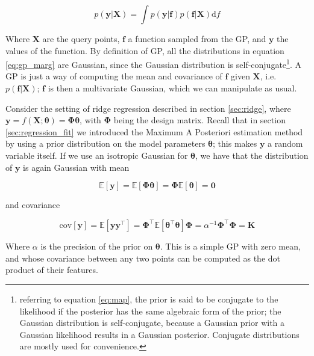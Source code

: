 \documentclass[a4paper]{book}
\begin{document}
\begin{equation}
\label{eq:gp_marg}
p(\bm y\vert\bm X)=\int p(\bm y\vert \bm f)p(\bm f\vert\bm X)\text{d}f
\end{equation}

Where $\bm X$ are the query points, $\bm f$ a function sampled from the GP, and $\bm y$ the values of the function. By definition of GP, all the distributions in equation \ref{eq:gp_marg} are Gaussian, since the Gaussian distribution is self-conjugate\footnote{referring to equation \ref{eq:map}, the prior is said to be conjugate to the likelihood if the posterior has the same algebraic form of the prior; the Gaussian distribution is self-conjugate, because a Gaussian prior with a Gaussian likelihood results in a Gaussian posterior. Conjugate distributions are mostly used for convenience.}. A GP is just a way of computing the mean and covariance of $\bm f$ given $\bm X$, i.e. $p(\bm f\vert\bm X)$; $\bm f$ is then a multivariate Gaussian, which we can manipulate as usual.

Consider the setting of ridge regression described in section \ref{sec:ridge}, where $\bm y=f(\bm X;\bm\theta)=\bm\Phi\bm\theta$, with $\bm\Phi$ being the design matrix. Recall that in section \ref{sec:regression_fit} we introduced the Maximum A Posteriori estimation method by using a prior distribution on the model parameters $\bm\theta$; this makes $\bm y$ a random variable itself. If we use an isotropic Gaussian for $\bm\theta$, we have that the distribution of $\bm y$ is again Gaussian with mean

\begin{equation}
\mathbb{E}[\bm y]=\mathbb{E}[\bm\Phi\bm\theta]=\bm\Phi\mathbb{E}[\bm\theta]=\bm 0
\end{equation}

and covariance

\begin{equation}
\text{cov}[\bm y]=\mathbb{E}[\bm y\bm y^\intercal]
=\bm\Phi^\intercal\mathbb{E}[\bm\theta^\intercal\bm\theta]\bm\Phi
=\alpha^{-1}\bm\Phi^\intercal\bm\Phi=\bm K
\end{equation}

Where $\alpha$ is the precision of the prior on $\bm\theta$. This is a simple GP with zero mean, and whose covariance between any two points can be computed as the dot product of their features.
\end{document}
